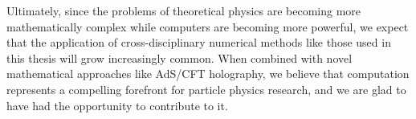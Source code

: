 Ultimately, since the problems of theoretical physics are becoming more 
mathematically complex while computers are becoming more powerful, we expect
that the application of cross-disciplinary numerical methods like those used in
this thesis will grow increasingly common. When combined with novel mathematical
approaches like AdS/CFT holography, we believe that computation represents a
compelling forefront for particle physics research, and we are glad to have had
the opportunity to contribute to it.

